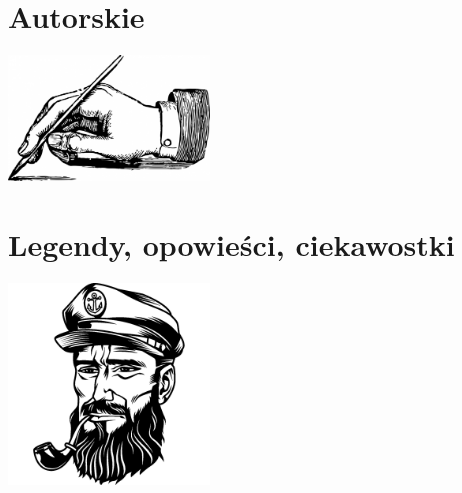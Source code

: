 \documentclass[11pt, twoside]{book}
\let\clearpage\relax
\begin{document}
\chapter{Autorskie}
\begin{center}
    \includegraphics[width=0.4\textwidth]{images/writing_hand.jpeg}
\end{center}
\pagestyle{autorskie}



\chapter{Legendy, opowieści, ciekawostki}
\begin{center}
    \includegraphics[width=0.4\textwidth]{images/bosman.png}
\end{center}
\pagestyle{legendy}


\clearpage{\mbox{}\pagestyle{empty}\cleardoublepage}
\end{document}
